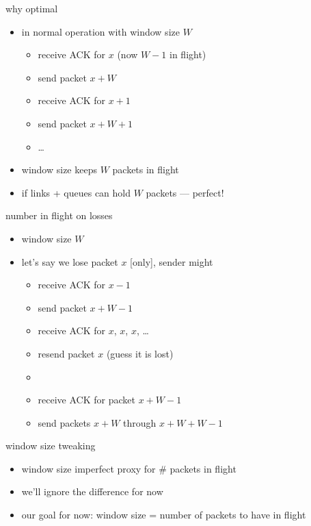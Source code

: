 \begin{frame}{why optimal}
    \begin{itemize}
    \item in normal operation with window size $W$
        \begin{itemize}
        \item receive ACK for $x$ (now $W-1$ in flight)
        \item send packet $x+W$
        \item receive ACK for $x+1$
        \item send packet $x+W+1$
        \item \ldots
        \end{itemize}
    \item window size keeps $W$ packets in flight
    \item if links + queues can hold $W$ packets --- perfect!
    \end{itemize}
\end{frame}

\begin{frame}{number in flight on losses}
    \begin{itemize}
    \item window size $W$
    \item let's say we lose packet $x$ [only], sender might
        \begin{itemize}
        \item receive ACK for $x-1$
        \item send packet $x+W-1$
        \item receive ACK for $x$, $x$, $x$, \ldots
        \item resend packet $x$ (guess it is lost)
        \item {}
        \item receive ACK for packet $x+W-1$ 
        \item send packets $x+W$ through $x+W+W-1$
        \end{itemize}
    \end{itemize}
\end{frame}

\begin{frame}{window size tweaking}
    \begin{itemize}
    \item window size imperfect proxy for \# packets in flight
    \item we'll ignore the difference for now
    \vspace{.5cm}
    \item our goal for now: window size = number of packets to have in flight
    \end{itemize}
\end{frame}

